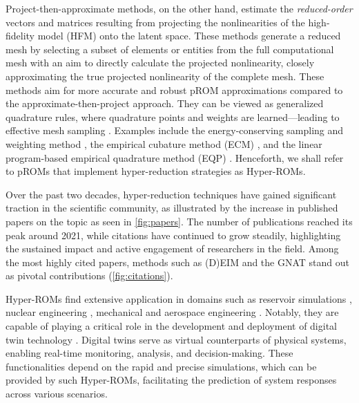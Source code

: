 \documentclass[11pt]{article}
\begin{document}
Project-then-approximate methods, on the other hand, estimate the \textit{reduced-order} vectors and matrices resulting from projecting the nonlinearities of the high-fidelity model (HFM) onto the latent space.
These methods generate a reduced mesh by selecting a subset of elements or entities from the full computational mesh with an aim to directly calculate the projected nonlinearity, closely approximating the true projected nonlinearity of the complete mesh.
These methods aim for more accurate and robust pROM approximations compared to the approximate-then-project approach.
They can be viewed as generalized quadrature rules, where quadrature points and weights are learned—leading to effective mesh sampling \cite{chapman2016accelerated}.
Examples include the energy-conserving sampling and weighting method \cite{farhat2015structure-preserving,tezaur2022robust,maierhofer2022model,farhat2014dimensional}, the empirical cubature method (ECM) \cite{hernandez2014high,bravo2024subspace,hernandez2020multiscale,hernandez2024cecm}, and the linear program-based empirical quadrature method (EQP) \cite{yano2019lp}.
Henceforth, we shall refer to pROMs that implement hyper-reduction strategies as Hyper-ROMs.



Over the past two decades, hyper-reduction techniques have gained significant traction in the scientific community, as illustrated by the increase in published papers on the topic as seen in \cref{fig:papers}.
The number of publications reached its peak around 2021, while citations have continued to grow steadily, highlighting the sustained impact and active engagement of researchers in the field.
Among the most highly cited papers, methods such as (D)EIM  and the GNAT \cite{carlberg2013gnat,jiang2019implementation} stand out as pivotal contributions (\cref{fig:citations}).

Hyper-ROMs find extensive application in domains such as reservoir simulations \cite{Jansen_2016,ghasemi2016localized,yoon2016hyper-reduced-order,Tan_2018,Jiang_2019_gnat,ghommem2016complexity,he2014reduced}, nuclear engineering \cite{german2019application,tano2021evaluation}, mechanical and aerospace engineering \cite{tiso2013discrete,antil2014application,farhat2014dimensional,hernandez2017dimensional,farhat2021_5_bookchapter,farhat2015structure-preserving,grimberg2021mesh}. %
Notably, they are capable of playing a critical role in the development and deployment of digital twin technology \cite{sharma2022digital,botin-sanabria2022digital,liu2021review,kapteyn2020toward}.
Digital twins serve as virtual counterparts of physical systems, enabling real-time monitoring, analysis, and decision-making.
These functionalities depend on the rapid and precise simulations, which can be provided by such Hyper-ROMs,  facilitating the prediction of system responses across various scenarios.
\end{document}
